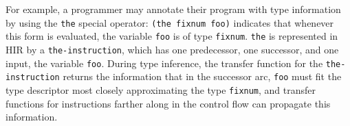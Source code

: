For example, a \commonlisp{} programmer may annotate their program
with type information by using the \texttt{the} special operator:
\texttt{(the fixnum foo)} indicates that whenever this form is
evaluated, the variable \texttt{foo} is of type
\texttt{fixnum}. \texttt{the} is represented in HIR by a
\texttt{the-instruction}, which has one predecessor, one successor,
and one input, the variable \texttt{foo}. During type inference, the
transfer function for the \texttt{the-instruction} returns the
information that in the successor arc, \texttt{foo} must fit the type
descriptor most closely approximating the \commonlisp{} type
\texttt{fixnum}, and transfer functions for instructions farther along
in the control flow can propagate this information.
